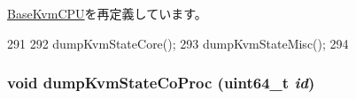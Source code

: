 \hyperlink{classBaseKvmCPU_accd2600060dbaee3a3b41aed4034c63c}{BaseKvmCPU}を再定義しています。


\begin{DoxyCode}
291 {
292     dumpKvmStateCore();
293     dumpKvmStateMisc();
294 }
\end{DoxyCode}
\hypertarget{classArmKvmCPU_a07eee5a82f9b81c1959175281ed1e12e}{
\subsubsection[{dumpKvmStateCoProc}]{\setlength{\rightskip}{0pt plus 5cm}void dumpKvmStateCoProc (uint64\_\-t {\em id})}}
\label{classArmKvmCPU_a07eee5a82f9b81c1959175281ed1e12e}



